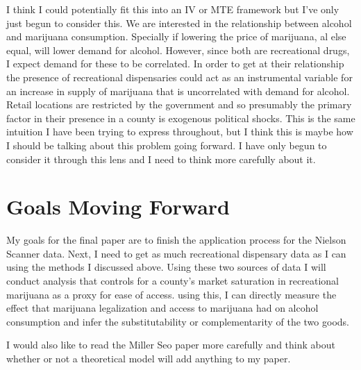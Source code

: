 \documentclass[11pt]{article}
\begin{document}
I think I could potentially fit this into an IV or MTE framework but I've only just begun to consider this. We are interested in the relationship between alcohol and marijuana consumption. Specially if lowering the price of marijuana, al else equal, will lower demand for alcohol. However, since both are recreational drugs, I expect demand for these to be correlated. In order to get at their relationship the presence of recreational dispensaries could act as an instrumental variable for an increase in supply of marijuana that is uncorrelated with demand for alcohol. Retail locations are restricted by the government and so presumably the primary factor in their presence in a county is exogenous political shocks. This is the same intuition I have been trying to express throughout, but I think this is maybe how I should be talking about this problem going forward. I have only begun to consider it through this lens and I need to think more carefully about it. \par 

\section{Goals Moving Forward}

My goals for the final paper are to finish the application process for the Nielson Scanner data. Next, I need to get as much recreational dispensary data as I can using the methods I discussed above. Using these two sources of data I will conduct analysis that controls for a county's market saturation in recreational marijuana as a proxy for ease of access. using this, I can directly measure the effect that marijuana legalization and access to marijuana had on alcohol consumption and infer the substitutability or complementarity of the two goods. \par 

I would also like to read the Miller Seo  paper more carefully and think about whether or not a theoretical model will add anything to my paper.  












\end{document}
